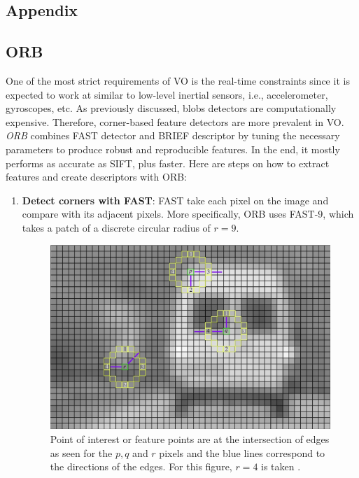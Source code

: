 \documentclass[12pt]{report}
\numberwithin{figure}{section}
\begin{document}


\begin{appendices}

\chapter{Appendix} \label{cp_appendices}

\section{ORB} \label{sb_sc_orb}

One of the most strict requirements of VO is the real-time constraints since 
it is expected to work at similar to low-level inertial sensors, i.e., 
accelerometer, gyroscopes, etc.  As previously discussed, blobs detectors are 
computationally expensive. Therefore, corner-based feature detectors are more 
prevalent in VO.  \textit{ORB} \parencite{Rublee2011a} combines FAST detector 
\parencite{Rosten2006} and BRIEF descriptor \parencite{M.2010} by tuning the 
necessary 
parameters to produce robust and reproducible features.  In the end, it mostly 
performs as accurate as SIFT, plus faster. Here are steps on how to extract 
features and create descriptors with ORB: 

\begin{enumerate}
	\item \textbf{Detect corners with FAST}: FAST take each pixel on 
	the image and compare with its adjacent pixels. More specifically, 
	ORB uses FAST-9, which takes a patch of a discrete circular radius of 
	$r=9$. 
	\begin{figure}[H]
		\centering
		\includegraphics[width=0.7\linewidth,natwidth=640,natheight=640]
		{fig/ref_imgs/fast.png}
		\caption[FAST Corners]
		{Point of interest or feature points are at the intersection of edges 
			as seen for the $p,q$ and $r$ pixels and the blue lines correspond 
			to 
			the directions of the edges. For this figure, $r=4$ is taken 
			\parencite{Klette2014}.}
		\label{fig:fast_corners}
	\end{figure}
	

\end{enumerate}
\end{appendices}
\end{document}
